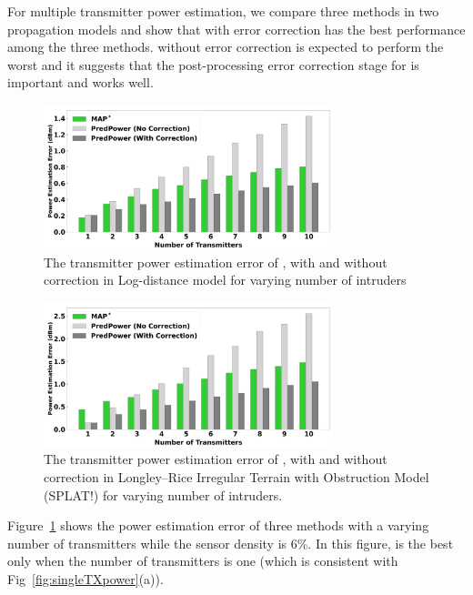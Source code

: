 For multiple transmitter power estimation, we compare three methods in two propagation models and show that \power with error correction has the best performance among the three methods.
\power without error correction is expected to perform the worst and it suggests that the post-processing error correction stage for \power is important and works well.
\begin{figure}[t]
    \centering
    \includegraphics[width=0.75\textwidth]{chapters/wowmom-pmc/figures/logdist-powererror_varyintru.png}
    \caption{The transmitter power estimation error of \map, \power with and without correction in Log-distance model for varying number of intruders}
    \label{fig:logdistance-multiTXpower}
\end{figure}
\begin{figure}[t]
    \centering
    \includegraphics[width=0.75\textwidth]{chapters/wowmom-pmc/figures/splat-powererror_varyintru.png}
    \vspace{-0.1in}
    \caption{The transmitter power estimation error of \map,  \power with and without correction in Longley--Rice Irregular Terrain with Obstruction Model (SPLAT!) for varying number of intruders.}
    \label{fig:splat-multiTXpower}
\end{figure}
Figure~\ref{fig:logdistance-multiTXpower} shows the power estimation error of three methods with a varying number of transmitters while the sensor density is 6\%.
In this figure, \map is the best only when the number of transmitters is one (which is consistent with Fig~\ref{fig:singleTXpower}(a)).
